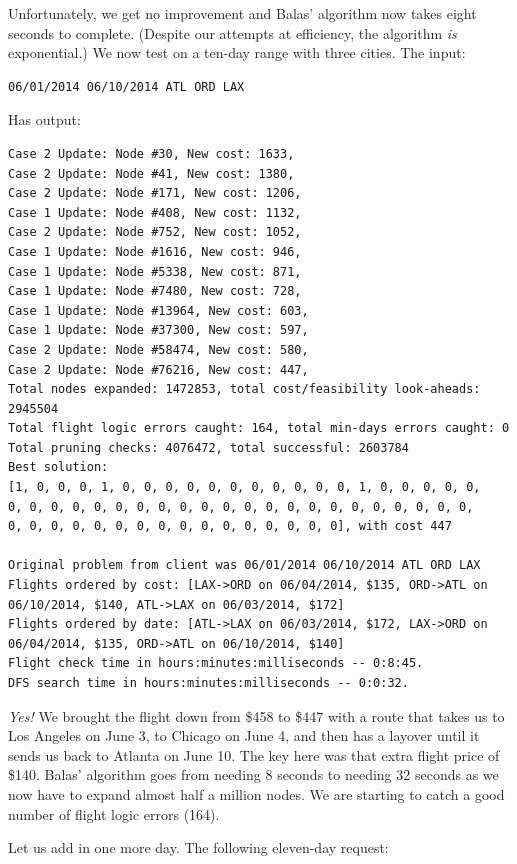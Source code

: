 \documentclass{article}
\begin{document}
Unfortunately, we get no improvement and Balas' algorithm now takes eight seconds to complete. (Despite our attempts at efficiency, the algorithm
\emph{is} exponential.) We now test on a ten-day range with three cities. The input:

\begin{verbatim}
06/01/2014 06/10/2014 ATL ORD LAX
\end{verbatim}

Has output:

\scriptsize
\begin{verbatim}
Case 2 Update: Node #30, New cost: 1633, 
Case 2 Update: Node #41, New cost: 1380, 
Case 2 Update: Node #171, New cost: 1206, 
Case 1 Update: Node #408, New cost: 1132, 
Case 2 Update: Node #752, New cost: 1052, 
Case 1 Update: Node #1616, New cost: 946, 
Case 1 Update: Node #5338, New cost: 871, 
Case 1 Update: Node #7480, New cost: 728, 
Case 1 Update: Node #13964, New cost: 603, 
Case 1 Update: Node #37300, New cost: 597, 
Case 2 Update: Node #58474, New cost: 580, 
Case 2 Update: Node #76216, New cost: 447, 
Total nodes expanded: 1472853, total cost/feasibility look-aheads: 2945504
Total flight logic errors caught: 164, total min-days errors caught: 0
Total pruning checks: 4076472, total successful: 2603784
Best solution:
[1, 0, 0, 0, 1, 0, 0, 0, 0, 0, 0, 0, 0, 0, 0, 0, 1, 0, 0, 0, 0, 0,
0, 0, 0, 0, 0, 0, 0, 0, 0, 0, 0, 0, 0, 0, 0, 0, 0, 0, 0, 0, 0, 0,
0, 0, 0, 0, 0, 0, 0, 0, 0, 0, 0, 0, 0, 0, 0, 0], with cost 447

Original problem from client was 06/01/2014 06/10/2014 ATL ORD LAX
Flights ordered by cost: [LAX->ORD on 06/04/2014, $135, ORD->ATL on 06/10/2014, $140, ATL->LAX on 06/03/2014, $172]
Flights ordered by date: [ATL->LAX on 06/03/2014, $172, LAX->ORD on 06/04/2014, $135, ORD->ATL on 06/10/2014, $140]
Flight check time in hours:minutes:milliseconds -- 0:8:45.
DFS search time in hours:minutes:milliseconds -- 0:0:32.
\end{verbatim}
\normalsize

\emph{Yes!} We brought the flight down from \$458 to \$447 with a route that takes us to Los Angeles on June 3, to Chicago on June 4, and then has a
layover until it sends us back to Atlanta on June 10. The key here was that extra flight price of \$140. Balas' algorithm goes from needing 8 seconds
to needing 32 seconds as we now have to expand almost half a million nodes. We are starting to catch a good number of flight logic errors (164).

Let us add in one more day. The following eleven-day request:
\end{document}
